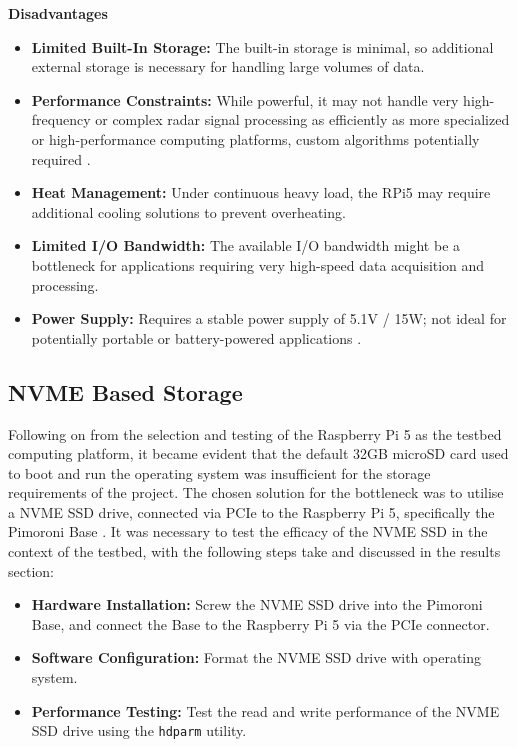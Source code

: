 \noindent \textbf{Disadvantages} 
\begin{itemize}
    \item \textbf{Limited Built-In Storage:} The built-in storage is minimal, so additional external storage is necessary for handling large volumes of data.
    \item \textbf{Performance Constraints:} While powerful, it may not handle very high-frequency or complex radar signal processing as efficiently as more specialized or high-performance computing platforms, custom algorithms potentially required \cite{IOTpassiveRadar}.
    \item \textbf{Heat Management:} Under continuous heavy load, the RPi5 may require additional cooling solutions to prevent overheating.
    \item \textbf{Limited I/O Bandwidth:} The available I/O bandwidth might be a bottleneck for applications requiring very high-speed data acquisition and processing.
    \item \textbf{Power Supply:} Requires a stable power supply of 5.1V / 15W; not ideal for potentially portable or battery-powered applications \cite{rpi5_wifi}. 
\end{itemize}



\subsection{NVME Based Storage \label{sec:storage}}
Following on from the selection and testing of the Raspberry Pi 5 as the testbed computing platform, it became evident that the default 32GB microSD card used to boot and run the operating system was insufficient for the storage requirements of the project. The chosen solution for the bottleneck was to utilise a NVME SSD drive, connected via PCIe to the Raspberry Pi 5, specifically the Pimoroni Base \cite{pimoroni_nvme_base}. It was necessary to test the efficacy of the NVME SSD in the context of the testbed, with the following steps take and discussed in the results section:
\begin{itemize}
    \item \textbf{Hardware Installation:} Screw the NVME SSD drive into the Pimoroni Base, and connect the Base to the Raspberry Pi 5 via the PCIe connector.
    \item \textbf{Software Configuration:} Format the NVME SSD drive with operating system.
    \item \textbf{Performance Testing:} Test the read and write performance of the NVME SSD drive using the \texttt{hdparm} utility.
\end{itemize}

